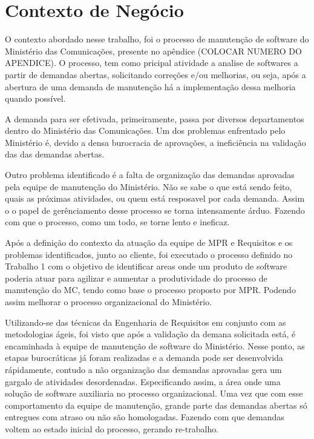 \chapter[Contexto de Negócio]{Contexto de Negócio}

O contexto abordado nesse trabalho, foi o processo de manutenção de software do Ministério das Comunicações, presente
no apêndice (COLOCAR NUMERO DO APENDICE). O processo, tem como pricipal atividade a analise de softwares a partir de
demandas abertas, solicitando correções e/ou melhorias, ou seja, após a abertura de uma demanda de manutenção há
a implementação dessa melhoria quando possível.

A demanda para ser efetivada, primeiramente, passa por diversos departamentos dentro do Ministério das Comunicações.
Um dos problemas enfrentado pelo Ministério é, devido a densa burocracia de aprovações, a ineficiência na validação das
das demandas abertas.

Outro problema identificado é a falta de organização das demandas aprovadas pela equipe de manutenção do Ministério.
Não se sabe o que está sendo feito, quais as próximas atividades, ou quem está resposavel por cada demanda. Assim o
o papel de gerênciamento desse processo se torna intensamente árduo. Fazendo com que o processo, como um todo, se torne
lento e ineficaz.

Após a definição do contexto da atuação da equipe de MPR e Requisitos e os problemas identificados, junto ao cliente,
foi executado o processo definido no Trabalho 1 com o objetivo de identificar areas onde um produto de software poderia
atuar para agilizar e aumentar a produtividade do processo de manutenção do MC, tendo como base o processo proposto por MPR.
Podendo assim melhorar o processo organizacional do Ministério.

Utilizando-se das técnicas da Engenharia de Requisitos em conjunto com as metodologias ágeis, foi visto que após a
validação da demana solicitada está, é encaminhada à equipe de manutenção de software do Ministério. Nesse ponto,
as etapas burocráticas já foram realizadas e a demanda pode ser desenvolvida rápidamente, contudo a não organização das
demandas aprovadas gera um gargalo de atividades desordenadas. Especificando assim, a área onde uma solução de software
auxiliaria no processo organizacional. Uma vez que com esse comportamento da equipe de manutenção, grande parte das demandas abertas só entregues com atraso ou não são
homologadas. Fazendo com que demandas voltem ao estado inicial do processo, gerando re-trabalho.

